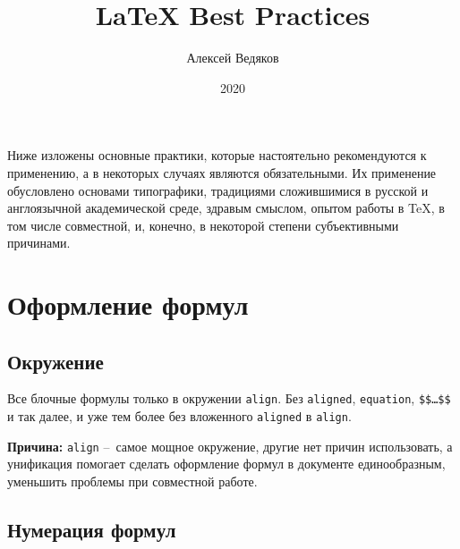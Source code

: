 \documentclass[12pt, a4paper]{article}
\title{{\LaTeX} Best Practices}
\author{Алексей Ведяков}
\date{2020}
\begin{document}
\maketitle
 
Ниже изложены основные практики, которые настоятельно рекомендуются к
применению, а в некоторых случаях являются обязательными. Их применение
обусловлено основами типографики, традициями сложившимися в русской и
англоязычной академической среде, здравым смыслом, опытом работы в TeX, в том числе совместной, и, конечно, в некоторой степени субъективными причинами.

\section{Оформление формул}

\subsection{Окружение}

Все блочные формулы только в окружении \texttt{align}. Без
\texttt{aligned}, \texttt{equation}, \texttt{\$\$\ldots\$\$} и так далее, и уже
тем более без вложенного \texttt{aligned} в \texttt{align}.

\textbf{Причина:} \texttt{align} --~самое мощное окружение, другие нет
причин использовать, а унификация помогает сделать оформление формул в
документе единообразным, уменьшить проблемы при совместной работе.

\subsection{Нумерация формул}
\end{document}
